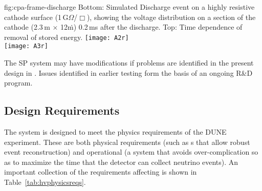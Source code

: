 \begin{dunefigure}
{fig:cpa-frame-discharge}
{Bottom: Simulated  Discharge event on a highly resistive cathode surface (1\,G$\Omega$/$\Box$), showing the voltage distribution on a section of the cathode (2.3\,m $\times$ 12\.m) 0.2\,ms after the discharge. Top: Time dependence of removal of stored energy.}
\centering
\texttt{[image: A2r]} \\ \vspace{30pt}    %
\texttt{[image: A3r]}
\end{dunefigure}

The SP  system may have modifications if problems are identified in the present design in . Issues identified in earlier testing form the basis of an ongoing R\&D program.



\subsection{Design Requirements}
\label{sec:fdsp-hv-des-consid}
 
The %
 system is designed to meet the physics requirements of the DUNE experiment. These are both physical requirements (such as \efield{}s that allow robust event reconstruction) and operational (a system that avoids over-complication so as to maximize the time that the detector can collect neutrino events). An important collection of the requirements affecting  is shown in 
Table~\ref{tab:hvphysicsreqs}.


